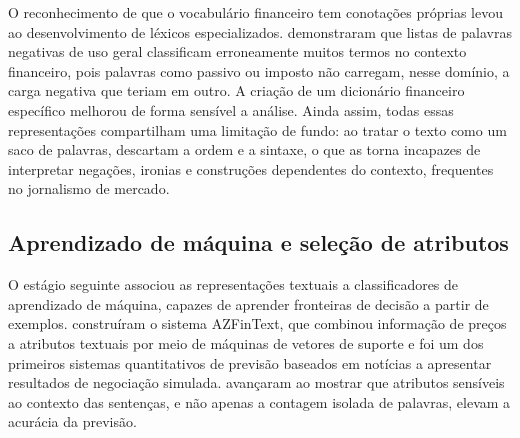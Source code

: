 O reconhecimento de que o vocabulário financeiro tem conotações próprias levou ao desenvolvimento de léxicos especializados.  demonstraram que listas de palavras negativas de uso geral classificam erroneamente muitos termos no contexto financeiro, pois palavras como passivo ou imposto não carregam, nesse domínio, a carga negativa que teriam em outro. A criação de um dicionário financeiro específico melhorou de forma sensível a análise. Ainda assim, todas essas representações compartilham uma limitação de fundo: ao tratar o texto como um saco de palavras, descartam a ordem e a sintaxe, o que as torna incapazes de interpretar negações, ironias e construções dependentes do contexto, frequentes no jornalismo de mercado.

\subsection{Aprendizado de máquina e seleção de atributos}

O estágio seguinte associou as representações textuais a classificadores de aprendizado de máquina, capazes de aprender fronteiras de decisão a partir de exemplos.  construíram o sistema AZFinText, que combinou informação de preços a atributos textuais por meio de máquinas de vetores de suporte e foi um dos primeiros sistemas quantitativos de previsão baseados em notícias a apresentar resultados de negociação simulada.  avançaram ao mostrar que atributos sensíveis ao contexto das sentenças, e não apenas a contagem isolada de palavras, elevam a acurácia da previsão.

